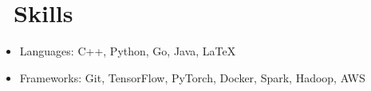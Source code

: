 \documentclass{resume}
\begin{document}

\section{\faCogs\ Skills}
\begin{itemize}[parsep=0.5ex]
  \item Languages: C++, Python, Go, Java, \LaTeX
  \item Frameworks: Git, TensorFlow, PyTorch, Docker, Spark, Hadoop, AWS
\end{itemize}

%
\end{document}
